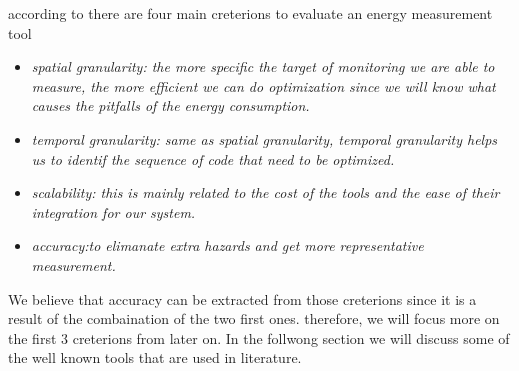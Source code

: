 according to \citeauthor{hackenberg2014hdeem} there are four main creterions to evaluate an energy measurement tool \cite{hackenberg2014hdeem}
\begin{itemize}
    \item \em{spatial granularity}: the more specific the target of monitoring we are able to measure, the more efficient we can do optimization since we will know what causes the pitfalls of the energy consumption.
    \item \em{temporal granularity}: same as spatial granularity, temporal granularity helps us to identif the sequence of code that need to be optimized.
    \item \em{scalability}: this is mainly related to the cost of the tools and the ease of their integration for our system.
    \item  \em{accuracy}:to elimanate extra hazards and get more representative measurement.
\end{itemize}

We believe that accuracy can be extracted from those creterions since it is a result of the combaination of the two first ones. therefore, we will focus more on the first 3 creterions from later on.
In the follwong section we will discuss some of the well known tools that are used in literature.


